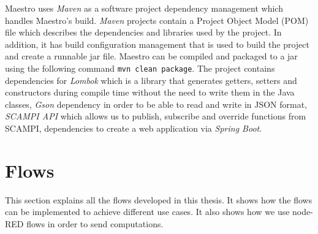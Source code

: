 \noindent Maestro uses \textit{Maven} as a  software project dependency management which handles Maestro's build. \textit{Maven} projects contain a Project Object Model (POM) file which describes the dependencies and libraries used by the project. In addition, it has build configuration management that is used to build the project and create a runnable jar file. Maestro can be compiled and packaged to a jar using the following command \verb|mvn clean package|. The project contains dependencies for \textit{Lombok} which is a library that generates getters, setters and constructors during compile time without the need to write them in the Java classes, \textit{Gson} dependency in order to be able to read and write in JSON format, \textit{SCAMPI API} which allows us to publish, subscribe and override  functions from SCAMPI, dependencies to create a web application via \textit{Spring Boot}. \\

\section{Flows}
This section explains all the flows developed in this thesis. It shows how the flows can be implemented to achieve different use cases. It also shows how we use node-RED flows in order to send computations.
